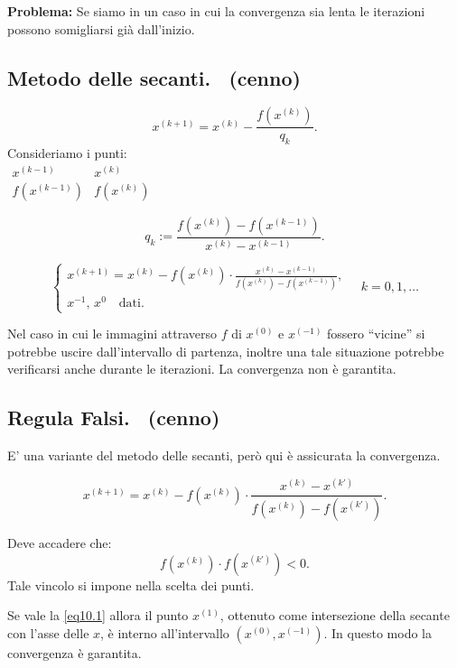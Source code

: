 \begin{flushleft}
\textbf{Problema:} Se siamo in un caso in cui la convergenza sia lenta
le iterazioni possono somigliarsi già dall'inizio.
\end{flushleft}

\subsection{Metodo delle secanti. \ (cenno)}

\[
x^{(k+1)} = x^{(k)} - \frac{f(x^{(k)})}{q_k}.
\]
Consideriamo i punti:\\

$\begin{array}{cc}
x^{(k-1)} & x^{(k)} \\
f(x^{(k-1)}) & f(x^{(k)})
\end{array}$

\[q_k := \frac{f(x^{(k)})-f(x^{(k-1)})}{x^{(k)}-x^{(k-1)}}.\]

\[\left\{
\begin{array}{l}
x^{(k+1)} = x^{(k)} - f(x^{(k)})\cdot 
\frac{x^{(k)}-x^{(k-1)}}{f(x^{(k)})-f(x^{(k-1)})}, \\
x^{-1}, \, x^0 \quad \textrm{dati.}
\end{array}\right. \quad k = 0,1, \ldots
\]

Nel caso in cui le immagini attraverso $f$ di $x^{(0)}$ e $x^{(-1)}$ fossero
``vicine'' si potrebbe uscire dall'intervallo di partenza, inoltre una tale 
situazione potrebbe verificarsi anche durante le iterazioni. La convergenza 
non è garantita.

\subsection{Regula Falsi. \ (cenno)}
E' una variante del metodo delle secanti, però qui è assicurata la 
convergenza. 

\[
x^{(k+1)} = x^{(k)} - f(x^{(k)}) \cdot \frac{x^{(k)}-x^{(k')}}{f(x^{(k)}) -
f(x^{(k')})}.
\]

Deve accadere che:
\begin{equation}\label{eq10.1}
f(x^{(k)}) \cdot f(x^{(k')}) < 0. 
\end{equation}
Tale vincolo si impone nella scelta dei punti.

Se vale la \ref{eq10.1} allora il punto $x^{(1)}$, ottenuto come intersezione 
della secante con l'asse delle $x$, è interno all'intervallo $(x^{(0)}, 
x^{(-1)})$. In questo modo la convergenza è garantita.

